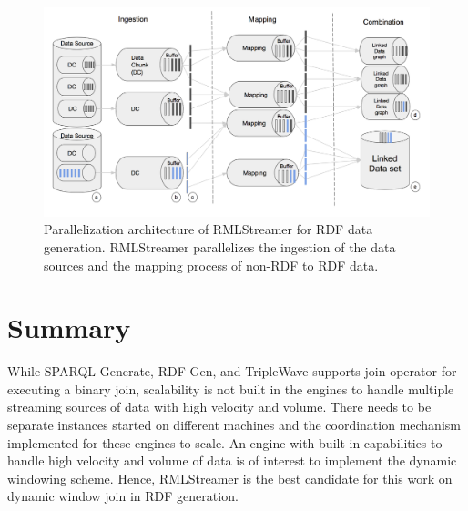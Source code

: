 \begin{figure}[!htbp]
  \centering
  \includegraphics[width=\textwidth]{fig/rml_streamer_arch.png}
  \caption{Parallelization architecture of RMLStreamer for RDF data generation. RMLStreamer parallelizes 
  the ingestion of the data sources and the mapping process of non-RDF to RDF data. }
  \label{fig:rml-parallel-arch}
\end{figure}


\section{Summary}
While SPARQL-Generate\cite{sparql_generate}, RDF-Gen\cite{rdf_gen}, and TripleWave\cite{triple_wave} 
supports join operator for executing a binary join, scalability is not built in the engines to handle multiple streaming 
sources of data with high velocity and volume. There needs to be separate instances started on different 
machines and the coordination mechanism implemented for these engines to scale. An engine
with built in capabilities to handle high velocity and volume of data is of interest
to implement the dynamic windowing scheme. 
Hence, RMLStreamer is the best candidate for this work on dynamic window join in RDF generation. 



